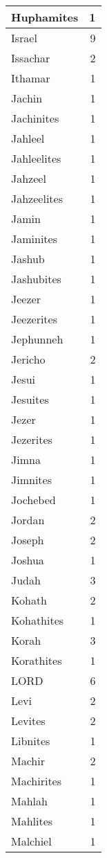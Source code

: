 \begin{center}
\begin{longtable}{l|r}
Huphamites & 1\\ \hline 
Israel & 9\\ \hline 
Issachar & 2\\ \hline 
Ithamar & 1\\ \hline 
Jachin & 1\\ \hline 
Jachinites & 1\\ \hline 
Jahleel & 1\\ \hline 
Jahleelites & 1\\ \hline 
Jahzeel & 1\\ \hline 
Jahzeelites & 1\\ \hline 
Jamin & 1\\ \hline 
Jaminites & 1\\ \hline 
Jashub & 1\\ \hline 
Jashubites & 1\\ \hline 
Jeezer & 1\\ \hline 
Jeezerites & 1\\ \hline 
Jephunneh & 1\\ \hline 
Jericho & 2\\ \hline 
Jesui & 1\\ \hline 
Jesuites & 1\\ \hline 
Jezer & 1\\ \hline 
Jezerites & 1\\ \hline 
Jimna & 1\\ \hline 
Jimnites & 1\\ \hline 
Jochebed & 1\\ \hline 
Jordan & 2\\ \hline 
Joseph & 2\\ \hline 
Joshua & 1\\ \hline 
Judah & 3\\ \hline 
Kohath & 2\\ \hline 
Kohathites & 1\\ \hline 
Korah & 3\\ \hline 
Korathites & 1\\ \hline 
LORD & 6\\ \hline 
Levi & 2\\ \hline 
Levites & 2\\ \hline 
Libnites & 1\\ \hline 
Machir & 2\\ \hline 
Machirites & 1\\ \hline 
Mahlah & 1\\ \hline 
Mahlites & 1\\ \hline 
Malchiel & 1\\ \hline 

\end{longtable}
\end{center}

